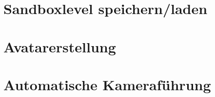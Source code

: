 \section{Sandboxlevel speichern/laden}

\section{Avatarerstellung}


\section{Automatische Kameraführung}

